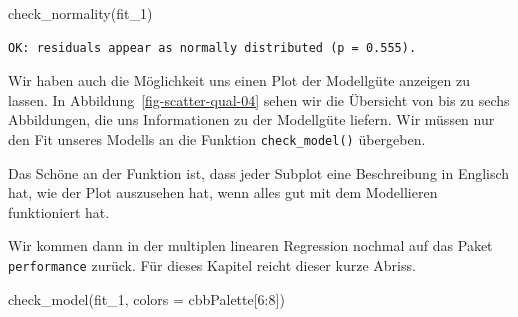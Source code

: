 \documentclass[
  letterpaper,
]{scrbook}
\newenvironment{Shaded}{\begin{snugshade}}{\end{snugshade}}
\newcommand{\AttributeTok}[1]{\textcolor[rgb]{0.40,0.45,0.13}{#1}}
\newcommand{\DecValTok}[1]{\textcolor[rgb]{0.68,0.00,0.00}{#1}}
\newcommand{\FunctionTok}[1]{\textcolor[rgb]{0.28,0.35,0.67}{#1}}
\newcommand{\NormalTok}[1]{\textcolor[rgb]{0.00,0.23,0.31}{#1}}
\newcommand{\SpecialCharTok}[1]{\textcolor[rgb]{0.37,0.37,0.37}{#1}}
\begin{document}
\begin{Shaded}
\begin{Highlighting}[]
\FunctionTok{check\_normality}\NormalTok{(fit\_1)}
\end{Highlighting}
\end{Shaded}

\begin{verbatim}
OK: residuals appear as normally distributed (p = 0.555).
\end{verbatim}

Wir haben auch die Möglichkeit uns einen Plot der Modellgüte anzeigen zu
lassen. In Abbildung~\ref{fig-scatter-qual-04} sehen wir die Übersicht
von bis zu sechs Abbildungen, die uns Informationen zu der Modellgüte
liefern. Wir müssen nur den Fit unseres Modells an die Funktion
\texttt{check\_model()} übergeben.

Das Schöne an der Funktion ist, dass jeder Subplot eine Beschreibung in
Englisch hat, wie der Plot auszusehen hat, wenn alles gut mit dem
Modellieren funktioniert hat.

Wir kommen dann in der multiplen linearen Regression nochmal auf das
Paket \texttt{performance} zurück. Für dieses Kapitel reicht dieser
kurze Abriss.

\begin{Shaded}
\begin{Highlighting}[]
\FunctionTok{check\_model}\NormalTok{(fit\_1, }\AttributeTok{colors =}\NormalTok{ cbbPalette[}\DecValTok{6}\SpecialCharTok{:}\DecValTok{8}\NormalTok{])}
\end{Highlighting}
\end{Shaded}
\end{document}
